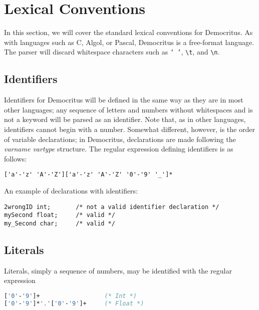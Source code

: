 \chapter{Lexical Conventions}
	In this section, we will cover the standard lexical conventions for Democritus. As with languages such as C, Algol, or Pascal, Democritus is a free-format language. The parser will discard whitespace characters such as \texttt{` '}, \texttt{\textbackslash t}, and \texttt{\textbackslash n}.
	
	\section{Identifiers}
		Identifiers for Democritus will be defined in the same way as they are in most other languages; any sequence of letters and numbers without whitespaces and is not a keyword will be parsed as an identifier. Note that, as in other languages, identifiers cannot begin with a number. Somewhat different, however, is the order of variable declarations; in Democritus, declarations are made following the \textit{varname vartype} structure. The regular expression defining identifiers is as follows:
		
	\begin{lstlisting}
['a'-'z' 'A'-'Z']['a'-'z' 'A'-'Z' '0'-'9' '_']*
	\end{lstlisting}
	
	\noindent An example of declarations with identifiers: 
	
	\begin{lstlisting}
2wrongID int;		/* not a valid identifier declaration */
mySecond float;		/* valid */
my_Second char;		/* valid */
	\end{lstlisting}
	
	\section{Literals}
		Literals, simply a sequence of numbers, may be identified with the regular expression
	\begin{lstlisting}[language=Caml]
['0'-'9']+ 					(* Int *)
['0'-'9']*'.'['0'-'9']+  	(* Float *)
	\end{lstlisting}
	
